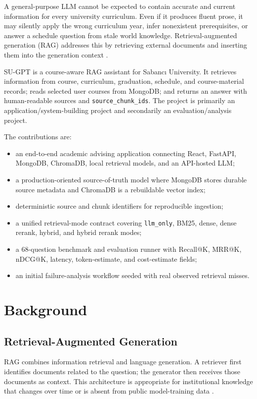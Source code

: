 \documentclass[11pt]{article}
\begin{document}
A general-purpose LLM cannot be expected to contain accurate and current information for every university curriculum. Even if it produces fluent prose, it may silently apply the wrong curriculum year, infer nonexistent prerequisites, or answer a schedule question from stale world knowledge. Retrieval-augmented generation (RAG) addresses this by retrieving external documents and inserting them into the generation context \cite{lewis2020rag}.

SU-GPT is a course-aware RAG assistant for Sabancı University. It retrieves information from course, curriculum, graduation, schedule, and course-material records; reads selected user courses from MongoDB; and returns an answer with human-readable sources and \texttt{source\_chunk\_ids}. The project is primarily an application/system-building project and secondarily an evaluation/analysis project.

The contributions are:
\begin{itemize}
\setlength\itemsep{0.18em}
  \item an end-to-end academic advising application connecting React, FastAPI, MongoDB, ChromaDB, local retrieval models, and an API-hosted LLM;
  \item a production-oriented source-of-truth model where MongoDB stores durable source metadata and ChromaDB is a rebuildable vector index;
  \item deterministic source and chunk identifiers for reproducible ingestion;
  \item a unified retrieval-mode contract covering \texttt{llm\_only}, BM25, dense, dense rerank, hybrid, and hybrid rerank modes;
  \item a 68-question benchmark and evaluation runner with Recall@K, MRR@K, nDCG@K, latency, token-estimate, and cost-estimate fields;
  \item an initial failure-analysis workflow seeded with real observed retrieval misses.
\end{itemize}

\section{Background}
\subsection{Retrieval-Augmented Generation}
RAG combines information retrieval and language generation. A retriever first identifies documents related to the question; the generator then receives those documents as context. This architecture is appropriate for institutional knowledge that changes over time or is absent from public model-training data \cite{lewis2020rag}.
\end{document}
